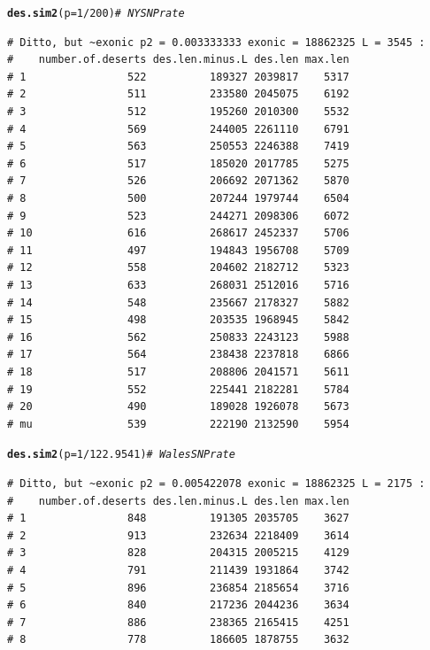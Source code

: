 \documentclass{article}\usepackage[]{graphicx}\usepackage[]{color}
\makeatletter
\newcommand{\hlnum}[1]{\textcolor[rgb]{0.686,0.059,0.569}{#1}}%
\newcommand{\hlcom}[1]{\textcolor[rgb]{0.678,0.584,0.686}{\textit{#1}}}%
\newcommand{\hlopt}[1]{\textcolor[rgb]{0,0,0}{#1}}%
\newcommand{\hlstd}[1]{\textcolor[rgb]{0.345,0.345,0.345}{#1}}%
\newcommand{\hlkwc}[1]{\textcolor[rgb]{0.333,0.667,0.333}{#1}}%
\newcommand{\hlkwd}[1]{\textcolor[rgb]{0.737,0.353,0.396}{\textbf{#1}}}%
\newenvironment{kframe}{%
 \def\at@end@of@kframe{}%
 \ifinner\ifhmode%
  \def\at@end@of@kframe{\end{minipage}}%
  \begin{minipage}{\columnwidth}%
 \fi\fi%
 \def\FrameCommand##1{\hskip\@totalleftmargin \hskip-\fboxsep
 \colorbox{shadecolor}{##1}\hskip-\fboxsep
     \hskip-\linewidth \hskip-\@totalleftmargin \hskip\columnwidth}%
 \MakeFramed {\advance\hsize-\width
   \@totalleftmargin\z@ \linewidth\hsize
   \@setminipage}}%
 {\par\unskip\endMakeFramed%
 \at@end@of@kframe}
\newenvironment{knitrout}{}{} %
\makeatother
\begin{document}
\begin{knitrout}\footnotesize
{}\color{fgcolor}\begin{kframe}
\begin{alltt}
\hlkwd{des.sim2}\hlstd{(}\hlkwc{p}\hlstd{=}\hlnum{1}\hlopt{/}\hlnum{200}\hlstd{)}       \hlcom{# ~ NY SNP rate}
\end{alltt}
\begin{verbatim}
# Ditto, but ~exonic p2 = 0.003333333 exonic = 18862325 L = 3545 :
#    number.of.deserts des.len.minus.L des.len max.len
# 1                522          189327 2039817    5317
# 2                511          233580 2045075    6192
# 3                512          195260 2010300    5532
# 4                569          244005 2261110    6791
# 5                563          250553 2246388    7419
# 6                517          185020 2017785    5275
# 7                526          206692 2071362    5870
# 8                500          207244 1979744    6504
# 9                523          244271 2098306    6072
# 10               616          268617 2452337    5706
# 11               497          194843 1956708    5709
# 12               558          204602 2182712    5323
# 13               633          268031 2512016    5716
# 14               548          235667 2178327    5882
# 15               498          203535 1968945    5842
# 16               562          250833 2243123    5988
# 17               564          238438 2237818    6866
# 18               517          208806 2041571    5611
# 19               552          225441 2182281    5784
# 20               490          189028 1926078    5673
# mu               539          222190 2132590    5954
\end{verbatim}
\begin{alltt}
\hlkwd{des.sim2}\hlstd{(}\hlkwc{p}\hlstd{=}\hlnum{1}\hlopt{/}\hlnum{122.9541}\hlstd{)}  \hlcom{# ~ Wales SNP rate}
\end{alltt}
\begin{verbatim}
# Ditto, but ~exonic p2 = 0.005422078 exonic = 18862325 L = 2175 :
#    number.of.deserts des.len.minus.L des.len max.len
# 1                848          191305 2035705    3627
# 2                913          232634 2218409    3614
# 3                828          204315 2005215    4129
# 4                791          211439 1931864    3742
# 5                896          236854 2185654    3716
# 6                840          217236 2044236    3634
# 7                886          238365 2165415    4251
# 8                778          186605 1878755    3632

\end{verbatim}
\end{kframe}
\end{knitrout}
\end{document}
